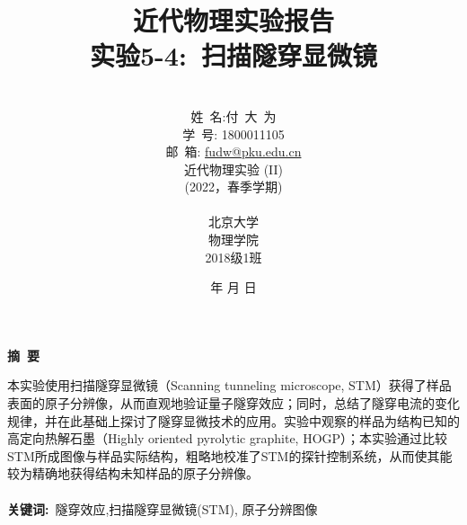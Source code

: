 \documentclass[a4paper]{article}
\begin{document}
\renewcommand{\contentsname}{目\ 录}
\renewcommand{\appendixname}{附录}
\renewcommand{\appendixpagename}{附录}
\renewcommand{\refname}{参考文献} 
\renewcommand{\figurename}{图}
\renewcommand{\tablename}{表}
\renewcommand{\today}{\number\year 年 \number\month 月 \number\day 日}
\newcommand{\refeq}[1]{\textbf{Eq.(\ref{#1})}}
\newcommand*{\circled}[1]{\lower.7ex\hbox{\tikz\draw (0pt, 0pt)%
    circle (.5em) node {\makebox[1em][c]{\small #1}};}}
    
\title{{\Huge 近代物理实验报告{\large\linebreak\\}}{\Large 实验5-4:\ 扫描隧穿显微镜\linebreak\linebreak}}
\author{\\姓\ 名:付\ 大\ 为\\
学\ 号: 1800011105\\
邮\ 箱: \url{fudw@pku.edu.cn}\\
近代物理实验 (II)\\
(2022，春季学期)\\\\
北京大学\\
物理学院\\
2018级1班}
\date{\today}
\maketitle
\newpage

\begin{center}
{\Large\bf{摘\ 要\\}}
\end{center}

本实验使用扫描隧穿显微镜（Scanning tunneling microscope, STM）获得了样品表面的原子分辨像，从而直观地验证量子隧穿效应；同时，总结了隧穿电流的变化规律，并在此基础上探讨了隧穿显微技术的应用。实验中观察的样品为结构已知的高定向热解石墨（Highly oriented pyrolytic graphite, HOGP）；本实验通过比较STM所成图像与样品实际结构，粗略地校准了STM的探针控制系统，从而使其能较为精确地获得结构未知样品的原子分辨像。
\\\\
{\bf{关键词}:}\ 隧穿效应,扫描隧穿显微镜(STM), 原子分辨图像

\newpage
\begin{center}
\tableofcontents\label{c}
\end{center}
\newpage
\end{document}
